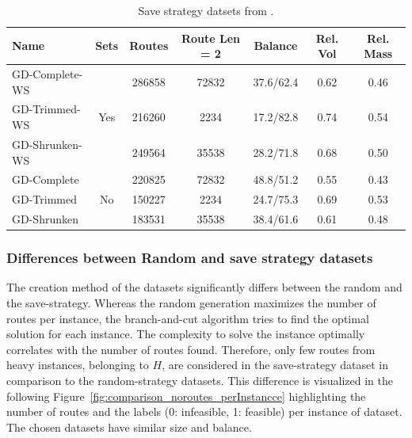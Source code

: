 \begin{table}[!ht]
	\centering
	\small
	\begin{tabular}{l c c c c c c }
		\toprule
		Name           & Sets                 & Routes & Route Len = 2 & Balance   & Rel. Vol & Rel. Mass \\
		\midrule
		GD-Complete-WS & \multirow{3}{*}{Yes} & 286858 & 72832         & 37.6/62.4 & 0.62     & 0.46      \\
		GD-Trimmed-WS  &                      & 216260 & 2234          & 17.2/82.8 & 0.74     & 0.54      \\
		GD-Shrunken-WS &                      & 249564 & 35538         & 28.2/71.8 & 0.68     & 0.50      \\        \midrule
		GD-Complete    & \multirow{3}{*}{No}  & 220825 & 72832         & 48.8/51.2 & 0.55     & 0.43      \\
		GD-Trimmed     &                      & 150227 & 2234          & 24.7/75.3 & 0.69     & 0.53      \\
		GD-Shrunken    &                      & 183531 & 35538         & 38.4/61.6 & 0.61     & 0.48      \\
		\bottomrule
	\end{tabular}
	\caption[Save strategy train datsets from \gendreauDataSet.]{Save strategy datsets from \gendreauDataSet.}
	\label{tab:saved_instances_gendreau}
\end{table}

\subsubsection{Differences between Random and save strategy datasets}

The creation method of the datasets significantly differs between the random and the save-strategy. Whereas the random
generation maximizes the number of routes per instance, the branch-and-cut algorithm tries to
find the optimal solution for each instance. The complexity to solve the instance optimally correlates with the number of routes found.
Therefore, only few routes from heavy instances, belonging to $H$, are considered in the save-strategy dataset
in comparison to the random-strategy datasets. This difference is visualized in the following Figure~\ref{fig:comparison_noroutes_perInstancce}
highlighting the number of routes and the labels (0: infeasible, 1: feasible) per instance of \gendreauDataSet dataset. The chosen
datasets have similar size and balance.

